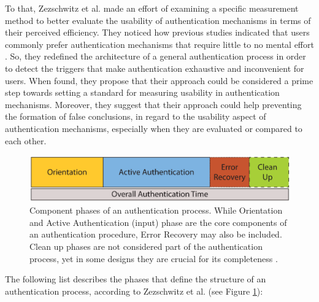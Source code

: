 To that, Zezschwitz et al. \cite{Zezschwitz} made an effort of examining a specific measurement method to better evaluate the usability of authentication mechanisms in terms of their perceived efficiency. They noticed how previous studies indicated that users commonly prefer authentication mechanisms that require little to no mental effort \cite{Zezschwitz, AnatomySmartphone}. So, they redefined the architecture of a general authentication process in order to detect the triggers that make authentication exhaustive and inconvenient for users. When found, they propose that their approach could be considered a prime step towards setting a standard for measuring usability in authentication mechanisms. Moreover, they suggest that their approach could help preventing the formation of false conclusions, in regard to the usability aspect of authentication mechanisms, especially when they are evaluated or compared to each other.  \\

\begin{figure}[t!]
\centering
\includegraphics[width=13cm, height=2cm]{Chapters/graphics/Phases.PNG}
\caption{Component phases of an authentication process. While Orientation and Active Authentication (input) phase are the core components of an authentication procedure, Error Recovery may also be included. Clean up phases are not considered part of the authentication process, yet in some designs they are crucial for its completeness \cite{Zezschwitz}. }
\label{fig:phases}
\end{figure}

The following list describes the phases that define the structure of an authentication process, according to Zezschwitz et al. \cite{Zezschwitz} (see Figure \ref{fig:phases}):

